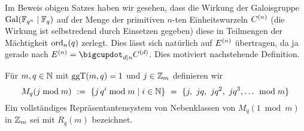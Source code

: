 \begin{lemma}
  \label{lemma:kreisteilungspolynome_in_binome}

\end{lemma}


Im Beweis obigen Satzes haben wir gesehen, dass die Wirkung der Galoisgruppe
$\operatorname{Gal}(\mathbb{F}_{q^n}\mid \mathbb{F}_q)$ auf der Menge der primitiven $n$-ten Einheitswurzeln
$C^{(n)}$ (die Wirkung ist selbstredend durch Einsetzen gegeben) diese in 
Teilmengen der Mächtigkeit $\operatorname{ord}_n(q)$ zerlegt.
Dies lässt sich natürlich auf $E^{(n)}$ übertragen, da ja gerade 
nach 
$E\kl n = \bigcupdot_{d\mid n} C\kl d$. 
Dies motiviert nachstehende Definition.


  


\begin{definition}
  Für $m,q\in\mathbb{N}$ mit $\operatorname{ggT}(m,q) = 1$ und $j \in \mathbb{Z}_m$ definieren wir
  \[ M_q(j\bmod m) \ :=\  \{ j\,q^i \bmod m\mid i\in\mathbb{N}\} \ =\  
    \{j,\ jq,\ jq^2,\ jq^3,\ldots\ \bmod m\}\]
  Ein vollständiges Repräsentantensystem von Nebenklassen von $M_q(1\bmod m)$
  in $\mathbb{Z}_m$ sei mit $R_q(m)$ bezeichnet.
\end{definition}


